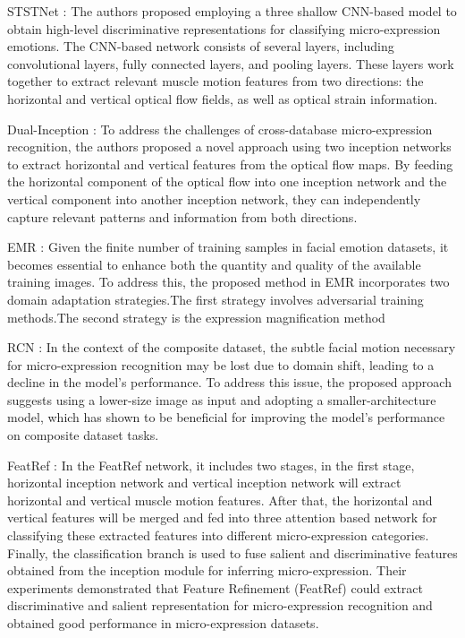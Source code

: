 \documentclass[review,12pt, 3p]{elsarticle}
\begin{document}
STSTNet \cite{ref-5}: The authors proposed employing a three shallow CNN-based model to obtain high-level discriminative representations for classifying micro-expression emotions. The CNN-based network consists of several layers, including convolutional layers, fully connected layers, and pooling layers. These layers work together to extract relevant muscle motion features from two directions: the horizontal and vertical optical flow fields, as well as optical strain information. 

Dual-Inception \cite{ref-44}: To address the challenges of cross-database micro-expression recognition, the authors proposed a novel approach using two inception networks to extract horizontal and vertical features from the optical flow maps. By feeding the horizontal component of the optical flow into one inception network and the vertical component into another inception network, they can independently capture relevant patterns and information from both directions.

EMR  \cite{ref-8}: Given the finite number of training samples in facial emotion datasets, it becomes essential to enhance both the quantity and quality of the available training images. To address this, the proposed method in EMR incorporates two domain adaptation strategies.The first strategy involves adversarial training methods.The second strategy is the expression magnification method

RCN  \cite{ref-6}: In the context of the composite dataset, the subtle facial motion necessary for micro-expression recognition may be lost due to domain shift, leading to a decline in the model's performance. To address this issue, the proposed approach suggests using a lower-size image as input and adopting a smaller-architecture model, which has shown to be beneficial for improving the model's performance on composite dataset tasks.

FeatRef \cite{ref-15}: In the FeatRef network, it includes two stages, in the first stage, horizontal inception network and vertical inception network will extract horizontal and vertical muscle motion features. After that, the  horizontal  and vertical features will be merged and fed into three attention based network for classifying these extracted features into different micro-expression categories. Finally, the classification branch is used to fuse salient and discriminative features obtained from the inception module for inferring micro-expression. Their experiments demonstrated that Feature Refinement (FeatRef) could extract discriminative and salient representation for micro-expression recognition and obtained good performance in micro-expression datasets. 
\end{document}
